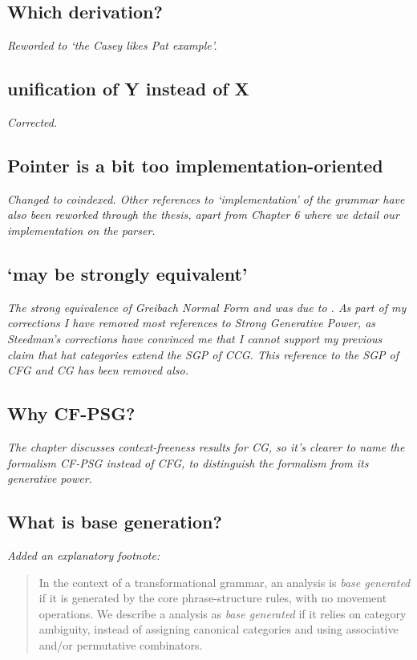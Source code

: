 \subsection{Which derivation?}

\emph{Reworded to `the \emph{Casey likes Pat} example'.}

\subsection{unification of Y instead of X}

\emph{Corrected.}

\subsection{Pointer is a bit too implementation-oriented}

\emph{Changed to coindexed. Other references to `implementation' of the grammar
have also been reworked through the thesis, apart from Chapter 6 where we detail
our implementation on the \candc parser.}

\subsection{`may be strongly equivalent'}

\emph{The strong equivalence of Greibach Normal Form \cfg and \abcg was due to
\citet{joshi:00}. As part of my corrections I have removed most references to
Strong Generative Power, as Steedman's corrections have convinced me that
I cannot support my previous claim that hat categories extend the SGP of CCG.
This reference to the SGP of CFG and CG has been removed also.}

\subsection{Why CF-PSG?}

\emph{The chapter discusses context-freeness results for CG, so it's clearer
to name the formalism CF-PSG instead of CFG, to distinguish the formalism from
its generative power.}

\subsection{What is base generation?}

\emph{Added an explanatory footnote:}

\begin{quote}
In the context of a transformational grammar, an analysis is \emph{base
generated} if it is generated by the core phrase-structure rules, with no
movement operations. We describe a \cg analysis as \emph{base generated} if it
relies on category ambiguity, instead of assigning canonical categories and
using associative and/or permutative combinators. 
\end{quote}


